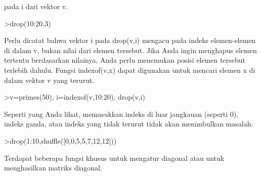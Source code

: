 \documentclass{article}
\newenvironment{eulernotebook}{\par}{\par}
\newenvironment{eulercomment}{\par\medskip}{\par\medskip}
\begin{document}
\begin{eulernotebook}
\begin{eulercomment}
\begin{eulercomment}
\begin{eulercomment}
\begin{eulercomment}
\begin{eulercomment}
\begin{eulercomment}
\begin{eulercomment}
pada i dari vektor v.
\end{eulercomment}
\begin{eulerprompt}
>drop(10:20,3)
\end{eulerprompt}
\begin{euleroutput}
  [10,  11,  13,  14,  15,  16,  17,  18,  19,  20]
\end{euleroutput}
\begin{eulercomment}
Perlu dicatat bahwa vektor i pada drop(v,i) mengacu pada indeks
elemen-elemen di dalam v, bukan nilai dari elemen tersebut. Jika Anda
ingin menghapus elemen tertentu berdasarkan nilainya, Anda perlu
menemukan posisi elemen tersebut terlebih dahulu. Fungsi indexof(v,x)
dapat digunakan untuk mencari elemen x di dalam vektor v yang terurut.
\end{eulercomment}
\begin{eulerprompt}
>v=primes(50), i=indexof(v,10:20), drop(v,i)
\end{eulerprompt}
\begin{euleroutput}
  [2,  3,  5,  7,  11,  13,  17,  19,  23,  29,  31,  37,  41,  43,  47]
  [0,  5,  0,  6,  0,  0,  0,  7,  0,  8,  0]
  [2,  3,  5,  7,  23,  29,  31,  37,  41,  43,  47]
\end{euleroutput}
\begin{eulercomment}
Seperti yang Anda lihat, memasukkan indeks di luar jangkauan (seperti
0), indeks ganda, atau indeks yang tidak terurut tidak akan
menimbulkan masalah.
\end{eulercomment}
\begin{eulerprompt}
>drop(1:10,shuffle([0,0,5,5,7,12,12]))
\end{eulerprompt}
\begin{euleroutput}
  [1,  2,  3,  4,  6,  8,  9,  10]
\end{euleroutput}
\begin{eulercomment}
Terdapat beberapa fungsi khusus untuk mengatur diagonal atau untuk
menghasilkan matriks diagonal.


\end{eulercomment}
\end{eulercomment}
\end{eulercomment}
\end{eulercomment}
\end{eulercomment}
\end{eulercomment}
\end{eulercomment}
\end{eulernotebook}
\end{document}
